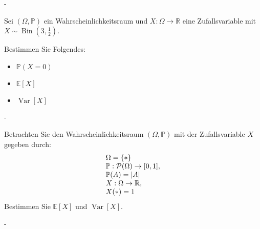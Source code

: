\documentclass{article}
\begin{document}
\begin{solution}
-
\end{solution}

\newpage

\begin{problem}
Sei $(\Omega, \mathbb{P})$ ein Wahrscheinlichkeitsraum und $X: \Omega \to \mathbb{R}$ eine Zufallsvariable mit $X \sim \operatorname{Bin} \left( 3, \frac{1}{2} \right)$.
\par
Bestimmen Sie Folgendes:
\begin{itemize}
\item $\mathbb{P}(X = 0)$
\item $\mathbb{E}[X]$
\item $\operatorname{Var}[X]$
\end{itemize}
\end{problem}

\begin{solution}
-
\end{solution}

\newpage

\begin{problem}
Betrachten Sie den Wahrscheinlichkeitsraum $(\Omega, \mathbb{P})$ mit der Zufallsvariable $X$ gegeben durch:
\[
\begin{array}{>{\displaystyle}l}
\Omega = \{\ast\} \\
\mathbb{P}: \mathcal{P}(\Omega) \to [0, 1], \\
\mathbb{P}(A) = |A| \\
X: \Omega \to \mathbb{R}, \\
X(\ast) = 1
\end{array}
\]
Bestimmen Sie $\mathbb{E}[X]$ und $\operatorname{Var}[X]$.
\end{problem}

\begin{solution}
-
\end{solution}

\newpage
\end{document}
